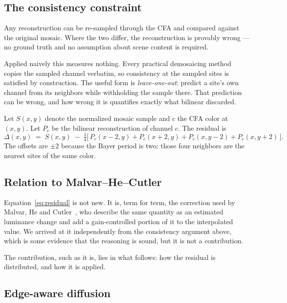 \documentclass[10pt,a4paper]{article}
\begin{document}
\subsection{The consistency constraint}

Any reconstruction can be re-sampled through the CFA and compared against the
original mosaic. Where the two differ, the reconstruction is provably wrong ---
no ground truth and no assumption about scene content is required.

Applied naively this measures nothing. Every practical demosaicing method copies
the sampled channel verbatim, so consistency at the sampled sites is satisfied
by construction. The useful form is \emph{leave-one-out}: predict a site's own
channel from its neighbors while withholding the sample there. That prediction
can be wrong, and how wrong it is quantifies exactly what bilinear discarded.

Let $S(x,y)$ denote the normalized mosaic sample and $c$ the CFA color at
$(x,y)$. Let $P_c$ be the bilinear reconstruction of channel $c$. The residual is
%
\begin{equation}
\Delta(x,y) \;=\; S(x,y) \;-\;
  \tfrac{1}{4}\bigl[\,P_c(x{-}2,y) + P_c(x{+}2,y)
                    + P_c(x,y{-}2) + P_c(x,y{+}2)\,\bigr].
\label{eq:residual}
\end{equation}
%
The offsets are $\pm 2$ because the Bayer period is two: those four neighbors
are the nearest sites of the same color.

\subsection{Relation to Malvar--He--Cutler}

Equation~\ref{eq:residual} is not new. It is, term for term, the correction
used by Malvar, He and Cutler~\cite{malvar2004}, who describe the same quantity
as an estimated luminance change and add a gain-controlled portion of it to the
interpolated value. We arrived at it independently from the consistency
argument above, which is some evidence that the reasoning is sound, but it is
not a contribution.

The contribution, such as it is, lies in what follows: how the residual is
distributed, and how it is applied.

\subsection{Edge-aware diffusion}
\end{document}
